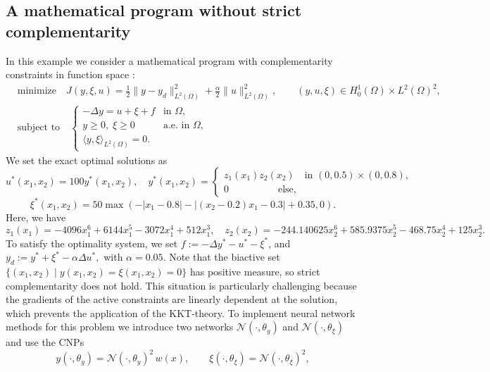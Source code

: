 \documentclass{article}
\numberwithin{equation}{section}
\begin{document}
\subsection{A mathematical program without strict complementarity}
\label{subsec:mpec}
In this example we consider a mathematical program with complementarity constraints in function space \cite{hintermuller2009mathematical}:
\begin{align}
\nonumber
&\text{minimize}\quad J(y,\xi,u)
=
\frac12\|y-y_d\|_{L^2(\Omega)}^2
+
\frac{\alpha}{2}\|u\|_{L^2(\Omega)}^2,
\qquad
(y,u,\xi)\in H_0^1(\Omega)\times L^2(\Omega)^2,\\
&\text{subject to}\quad
\label{equa:const_mp}
\begin{cases}
-\Delta y = u+\xi+f & \text{in }\Omega,\\
y\ge0,\;\xi\ge0 & \text{a.e. in }\Omega,\\
\langle y,\xi\rangle_{L^2(\Omega)}=0.
\end{cases}
\end{align}
We set the exact optimal solutions as
\begin{equation}
   u^*(x_1,x_2)=100 y^*(x_1,x_2),\quad y^*(x_1,x_2)=\begin{cases}
   z_1(x_1)z_2(x_2)\quad \text{in }  (0,0.5)\times(0,0.8),\\
        0\quad \qquad\qquad  \text{else},
    \end{cases}
\end{equation}
\begin{equation}
    \xi^*(x_1,x_2)=50\max(-|x_1-0.8|-|(x_2-0.2)x_1-0.3|+0.35,0).
\end{equation}
Here, we have
\[
z_1(x_1)
=
-4096x_1^6+6144x_1^5-3072x_1^4+512x_1^3,
\quad
z_2(x_2)
=
-244.140625x_2^6+585.9375x_2^5-468.75x_2^4+125x_2^3 .
\]
To satisfy the optimality system, we set $f:=-\Delta y^*-u^*-\xi^*$, and $y_d:=y^*+\xi^*-\alpha\Delta u^*,$ with $\alpha=0.05$. Note that the biactive set $\{(x_1,x_2)\mid y(x_1,x_2)=\xi(x_1,x_2)=0\}$ has positive measure, so strict complementarity does not hold. This situation is particularly challenging because the gradients of the active constraints are linearly dependent at the solution, which prevents the application of the KKT-theory. To implement neural network methods for this problem we introduce two networks $\mathcal N(\cdot,\theta_y)$ and $\mathcal N(\cdot,\theta_\xi)$ and use the CNPs
\begin{equation}
y(\cdot,\theta_y)=\mathcal N(\cdot,\theta_y)^2\,w(x),
\qquad
\xi(\cdot,\theta_\xi)=\mathcal N(\cdot,\theta_\xi)^2,    
\end{equation}
\end{document}
